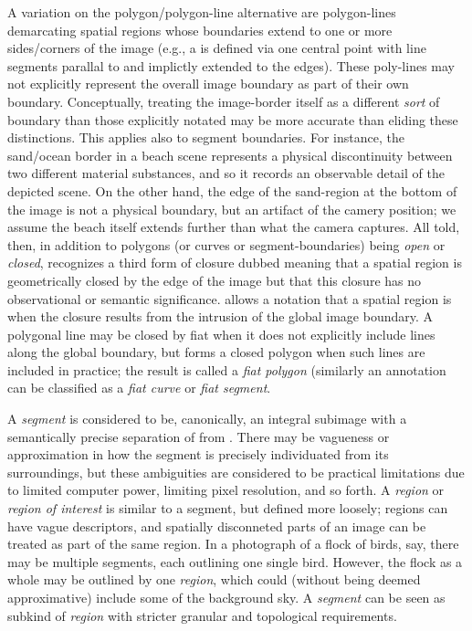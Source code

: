 {\begin{description}
A variation on the polygon/polygon-line alternative 
are polygon-lines demarcating spatial regions 
whose boundaries extend to one or more sides/corners 
of the image (e.g., a  is defined 
via one central point with line segments 
parallal to and implictly 
extended to the edges).  These poly-lines 
may not explicitly represent the overall image 
boundary as part of their own boundary.  
Conceptually, treating the image-border itself 
as a different \textit{sort} of boundary than 
those explicitly notated may be more accurate 
than eliding these distinctions.  This 
applies also to segment boundaries.  For instance, 
the sand/ocean border in a beach scene represents 
a physical discontinuity between two different 
material substances, and so it records an 
observable detail of the depicted scene.  
On the other hand, the edge of the sand-region 
at the bottom of the image is not a physical 
boundary, but an artifact of the camery position; 
we assume the beach itself extends further than 
what the camera captures.  All told, then, 
in addition to polygons (or curves or segment-boundaries) 
being \textit{open} or \textit{closed}, \AXFI{} 
recognizes a third form of closure dubbed 
 meaning that a spatial region is 
geometrically closed by the edge of the image but 
that this closure has no observational or semantic 
significance.  \lAXFI{} allows a notation that 
a spatial region is  when the closure 
results from the intrusion of the global image boundary.  
A polygonal line may be closed by fiat when it does 
not explicitly include lines along the global boundary, 
but forms a closed polygon when such lines are 
included in practice; the result is called a 
\textit{fiat polygon} (similarly an annotation 
can be classified as a \textit{fiat curve} or 
\textit{fiat segment}.
   

\item[Segments and Regions]  A \textit{segment} is 
considered to be, canonically, an integral 
subimage with a semantically precise 
separation of  from .  
There may be vagueness or approximation 
in how the segment is precisely individuated 
from its surroundings, but these ambiguities 
are considered to be practical limitations 
due to limited computer power, limiting pixel 
resolution, and so forth.  A \textit{region} 
or \textit{region of interest} is similar to a 
segment, but defined more loosely; regions 
can have vague descriptors, and spatially 
disconneted parts of an image can be treated 
as part of the same region.  In a photograph 
of a flock of birds, say, there may be 
multiple segments, each outlining one single bird.  
However, the flock as a whole may be outlined 
by one \textit{region}, which could (without 
being deemed approximative) include some of the 
background sky.  A \textit{segment} can be seen 
as subkind of \textit{region} with stricter 
granular and topological requirements. 


\end{description}}

